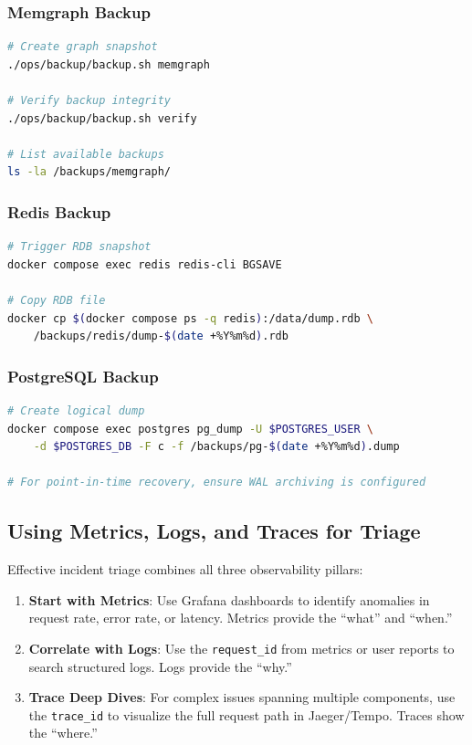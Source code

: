 \subsubsection{Memgraph Backup}

\begin{lstlisting}[language=bash, caption={Memgraph backup procedure}]
# Create graph snapshot
./ops/backup/backup.sh memgraph

# Verify backup integrity
./ops/backup/backup.sh verify

# List available backups
ls -la /backups/memgraph/
\end{lstlisting}

\subsubsection{Redis Backup}

\begin{lstlisting}[language=bash, caption={Redis backup procedure}]
# Trigger RDB snapshot
docker compose exec redis redis-cli BGSAVE

# Copy RDB file
docker cp $(docker compose ps -q redis):/data/dump.rdb \
    /backups/redis/dump-$(date +%Y%m%d).rdb
\end{lstlisting}

\subsubsection{PostgreSQL Backup}

\begin{lstlisting}[language=bash, caption={PostgreSQL backup procedure}]
# Create logical dump
docker compose exec postgres pg_dump -U $POSTGRES_USER \
    -d $POSTGRES_DB -F c -f /backups/pg-$(date +%Y%m%d).dump

# For point-in-time recovery, ensure WAL archiving is configured
\end{lstlisting}

\subsection{Using Metrics, Logs, and Traces for Triage}

Effective incident triage combines all three observability pillars:

\begin{enumerate}
    \item \textbf{Start with Metrics}: Use Grafana dashboards to identify anomalies in request rate, error rate, or latency. Metrics provide the ``what'' and ``when.''
    
    \item \textbf{Correlate with Logs}: Use the \texttt{request\_id} from metrics or user reports to search structured logs. Logs provide the ``why.''
    
    \item \textbf{Trace Deep Dives}: For complex issues spanning multiple components, use the \texttt{trace\_id} to visualize the full request path in Jaeger/Tempo. Traces show the ``where.''
\end{enumerate}

